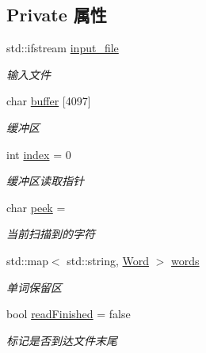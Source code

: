 \subsection*{Private 属性}
\begin{DoxyCompactItemize}
\item 
std\+::ifstream \hyperlink{class_lexer_a606dd5cec5ec316ca1b1df40823fb853}{input\+\_\+file}\hypertarget{class_lexer_a606dd5cec5ec316ca1b1df40823fb853}{}\label{class_lexer_a606dd5cec5ec316ca1b1df40823fb853}

\begin{DoxyCompactList}\small\item\em 输入文件 \end{DoxyCompactList}\item 
char \hyperlink{class_lexer_a372c56c466c70d808bdcdb11e94bd914}{buffer} \mbox{[}4097\mbox{]}\hypertarget{class_lexer_a372c56c466c70d808bdcdb11e94bd914}{}\label{class_lexer_a372c56c466c70d808bdcdb11e94bd914}

\begin{DoxyCompactList}\small\item\em 缓冲区 \end{DoxyCompactList}\item 
int \hyperlink{class_lexer_a266317e9b89ad0e681fdb21032ef00f8}{index} = 0\hypertarget{class_lexer_a266317e9b89ad0e681fdb21032ef00f8}{}\label{class_lexer_a266317e9b89ad0e681fdb21032ef00f8}

\begin{DoxyCompactList}\small\item\em 缓冲区读取指针 \end{DoxyCompactList}\item 
char \hyperlink{class_lexer_a1c13ae056a34e7ec483c561152bb8d49}{peek} = \textquotesingle{} \textquotesingle{}\hypertarget{class_lexer_a1c13ae056a34e7ec483c561152bb8d49}{}\label{class_lexer_a1c13ae056a34e7ec483c561152bb8d49}

\begin{DoxyCompactList}\small\item\em 当前扫描到的字符 \end{DoxyCompactList}\item 
std\+::map$<$ std\+::string, \hyperlink{class_word}{Word} $>$ \hyperlink{class_lexer_add52df03b8546bfe059f4e1832141c16}{words}\hypertarget{class_lexer_add52df03b8546bfe059f4e1832141c16}{}\label{class_lexer_add52df03b8546bfe059f4e1832141c16}

\begin{DoxyCompactList}\small\item\em 单词保留区 \end{DoxyCompactList}\item 
bool \hyperlink{class_lexer_a123d0134daef2ce492f0707342456afc}{read\+Finished} = false\hypertarget{class_lexer_a123d0134daef2ce492f0707342456afc}{}\label{class_lexer_a123d0134daef2ce492f0707342456afc}

\begin{DoxyCompactList}\small\item\em 标记是否到达文件末尾 \end{DoxyCompactList}\end{DoxyCompactItemize}
